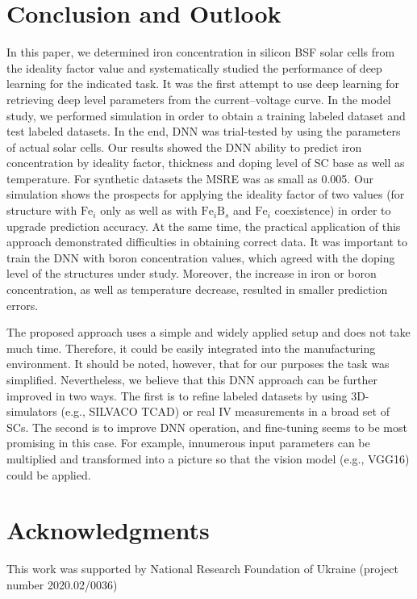 \documentclass[num-refs]{wiley-article} %
\begin{document}
\section{Conclusion and Outlook}

In this paper,
we determined iron concentration in silicon BSF solar cells from
the ideality factor value and systematically studied the performance
of deep learning for the indicated task.
It was  the first attempt to use deep learning for retrieving deep level parameters from the current--voltage curve.
In the model study,
we performed simulation in order to obtain a training labeled dataset and test labeled datasets.
In the end, DNN was trial-tested by using the parameters of actual solar cells.
Our results showed the DNN ability
to predict iron concentration by ideality factor,
thickness and doping level of SC base as well as temperature.
For synthetic datasets the MSRE was as small as 0.005.
Our simulation shows the prospects for applying the ideality factor of two values (for structure with $\mathrm{Fe}_i$ only as well as with $\mathrm{Fe}_i\mathrm{B}_s$ and
$\mathrm{Fe}_i$ coexistence)
in order to upgrade prediction accuracy.
At the same time, the practical application of this approach demonstrated difficulties in obtaining correct data.
It was important to train the DNN with boron concentration values,
which agreed with the doping level of the structures under study.
Moreover, the increase in iron or boron concentration, as well as temperature decrease,
resulted in smaller prediction errors.

The proposed approach uses a simple and widely applied setup and does not take much time.
Therefore, it could be easily integrated into the manufacturing environment.
It should be noted, however, that for our purposes the task was  simplified.
Nevertheless, we believe that this DNN approach can be further improved in two ways.
The first is to refine labeled datasets by using 3D-simulators (e.g., SILVACO TCAD) or real IV measurements in a broad set of SCs.
The second is to improve DNN operation, and fine-tuning seems to be most promising in this case.
For example,
innumerous input parameters can be multiplied and transformed into a picture
so that the vision model (e.g., VGG16) could be applied.



\section*{Acknowledgments}
This work was supported by National Research Foundation  of Ukraine
(project number 2020.02/0036)
\end{document}
